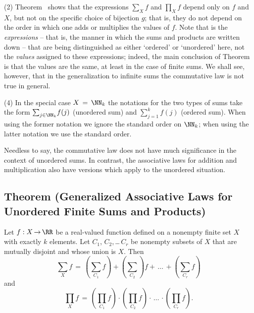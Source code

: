 \V

        (2) Theorem~ shows that the expressions ${\sum}_{X} f$ and ${\prod}_{X} f$ depend only on $f$ and $X$,
    but not on the specific choice of bijection $g$; that is, they do not depend on the order in which one adds or multiplies the values of $f$.
        Note that is the {\em expressions} -- that is, the manner in which the sums and products are written down -- that are being distinguished as either `ordered' or `unordered' here, not the {\em values} assigned to these expressions;
    indeed, the main conclusion of Theorem~ is that the values are the same, at least in the case of finite sums.
    We shall see, however, that in the generalization to infinite sums the commutative law is not true in general.


\V

        (4) In the special case $X \,=\, {\NN}_{k}$ the notations for the two types of sums take the form ${\sum}_{j{\in}{\NN}_{k}} f(j)$ (unordered sum) and $\sum_{j=1}^{k} f(j)$ (ordered sum).
   When using the former notation we ignore the standard order on ${\NN}_{k}$; when using the latter notation we use the standard order.

\V
\V

        Needless to say, the commutative law does not have much significance in the context of unordered sums.
    In contrast, the associative laws for addition and multiplication also have versions which apply to the unordered situation. %

\V

            \subsection{\small{\bf Theorem} (Generalized Associative Laws for Unordered Finite Sums and Products)}
            \label{ThmB10.60}

        Let $f:X \,{\rightarrow}\, {\RR}$ be a real-valued function defined on a nonempty finite set $X$ with exactly $k$ elements.
    Let $C_{1}$, $C_{2}$,\,{\ldots}\,$C_{r}$ be nonempty subsets of $X$ that are mutually disjoint and whose union is $X$.
    Then
        \begin{equation}
        \label{EqnB.20A}
        {\sum}_{X} f \,=\, ({\sum}_{C_{1}} f) + ({\sum}_{C_{2}}) f + \,{\ldots}\, + ({\sum}_{C_{r}} f)
        \end{equation}
    and
        \begin{equation}
        \label{EqnB.20B}
        {\prod}_{X} f \,=\, ({\prod}_{C_{1}} f){\cdot}({\prod}_{C_{2}} f){\cdot}\,{\ldots}\,{\cdot}({\prod}_{C_{r}} f).
        \end{equation} %
 
